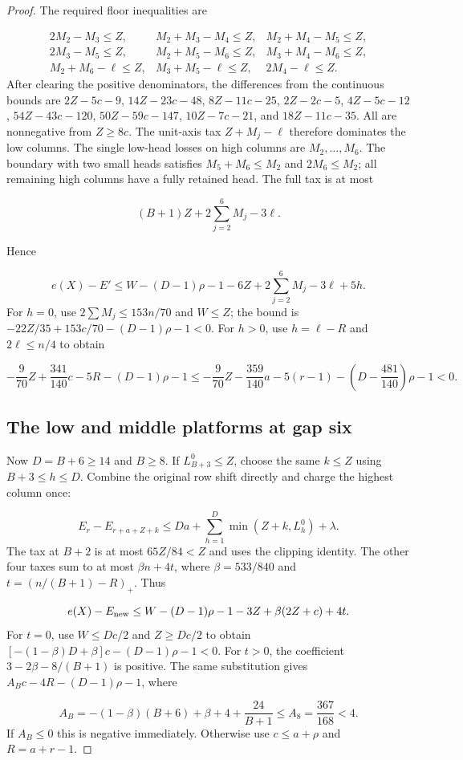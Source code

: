 \documentclass[11pt,a4paper]{article}
\theoremstyle{definition}
\begin{document}
\begin{proof}
The required floor inequalities are

\[
\begin{array}{lll}
2M_2-M_3\le Z,&M_2+M_3-M_4\le Z,&M_2+M_4-M_5\le Z,\\
2M_3-M_5\le Z,&M_2+M_5-M_6\le Z,&M_3+M_4-M_6\le Z,\\
M_2+M_6-\ell\le Z,&M_3+M_5-\ell\le Z,&2M_4-\ell\le Z.
\end{array}
\]
After clearing the positive denominators, the differences from the continuous bounds are
$2Z-5c-9$, $14Z-23c-48$, $8Z-11c-25$,
$2Z-2c-5$, $4Z-5c-12$, $54Z-43c-120$,
$50Z-59c-147$, $10Z-7c-21$, and $18Z-11c-35$.
All are nonnegative from $Z\ge8c$.
The unit-axis tax $Z+M_j-\ell$ therefore dominates the low columns.
The single low-head losses on high columns are $M_2,\ldots,M_6$.
The boundary with two small heads satisfies
$M_5+M_6\le M_2$ and $2M_6\le M_2$;
all remaining high columns have a fully retained head.
The full tax is at most

\[
(B+1)Z+2\sum_{j=2}^{6}M_j-3\ell.
\]

Hence

\[
e(X)-E'\le W-(D-1)\rho-1-6Z+2\sum_{j=2}^{6}M_j-3\ell+5h.
\]
For $h=0$, use $2\sum M_j\le153n/70$ and $W\le Z$;
the bound is $-22Z/35+153c/70-(D-1)\rho-1<0$.
For $h>0$, use $h=\ell-R$ and $2\ell\le n/4$ to obtain

\[
-\frac9{70}Z+\frac{341}{140}c-5R-(D-1)\rho-1
\le-\frac9{70}Z-\frac{359}{140}a-5(r-1)
 -\left(D-\frac{481}{140}\right)\rho-1<0.
\]
\subsection*{The low and middle platforms at gap six}
Now $D=B+6\ge14$ and $B\ge8$.
If $L_{B+3}^0\le Z$, choose the same $k\le Z$ using $B+3\le h\le D$.
Combine the original row shift directly and charge the highest column once:

\[
E_r-E_{r+a+Z+k}\le Da+\sum_{h=1}^{D}\min(Z+k,L_h^0)+\lambda .
\]
The tax at $B+2$ is at most $65Z/84<Z$ and uses the clipping identity.
The other four taxes sum to at most $\beta n+4t$, where
$\beta=533/840$ and $t=(n/(B+1)-R)_+$. Thus

\[
e(X)-E_{\rm new}\le W-(D-1)\rho-1-3Z+\beta(2Z+c)+4t.
\]
For $t=0$, use $W\le Dc/2$ and $Z\ge Dc/2$ to obtain
$[-(1-\beta)D+\beta]c-(D-1)\rho-1<0$.
For $t>0$, the coefficient $3-2\beta-8/(B+1)$ is positive.
The same substitution gives $A_Bc-4R-(D-1)\rho-1$, where

\[
A_B=-(1-\beta)(B+6)+\beta+4+\frac{24}{B+1}
\le A_8=\frac{367}{168}<4.
\]
If $A_B\le0$ this is negative immediately.
Otherwise use $c\le a+\rho$ and $R=a+r-1$.


\end{proof}
\end{document}
